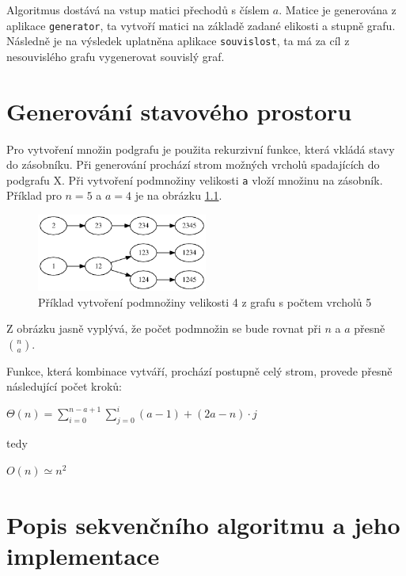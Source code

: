 \documentclass[a4paper,10pt]{report}
\begin{document}
Algoritmus dostává na vstup matici přechodů s číslem $a$. Matice je generována z aplikace \texttt{generator}, ta vytvoří matici na základě zadané elikosti a stupně grafu. Následně je na výsledek uplatněna aplikace \texttt{souvislost}, ta má za cíl z nesouvislého grafu vygenerovat souvislý graf.

\chapter{Generování stavového prostoru}

Pro vytvoření množin podgrafu je použita rekurzivní funkce, která vkládá stavy do zásobníku. Při generování prochází strom možných vrcholů spadajících do podgrafu X. Při vytvoření podmnožiny velikosti \texttt{a} vloží množinu na zásobník. Příklad pro $n=5$ a $a=4$ je na obrázku \ref{fig:com}.

\begin{figure}[H]
  \centering
    \includegraphics[width=0.5\textwidth]{a45.png}
  \caption{Příklad vytvoření podmnožiny velikosti 4 z grafu s počtem vrcholů 5}
  \label{fig:com}
\end{figure}


Z obrázku jasně vyplývá, že počet podmnožin se bude rovnat při $n$ a $a$ přesně ${n\choose a}$.

Funkce, která kombinace vytváří, prochází postupně celý strom, provede přesně následující počet kroků:

\hspace{1cm}

$\Theta(n) = \sum^{n-a+1}_{i=0}\sum^{i}_{j=0} (a-1) + (2a-n)\cdot j$

\hspace{1cm}

tedy

\hspace{1cm}

$O(n) \simeq n^2$

\hspace{1cm}

\chapter{Popis sekvenčního algoritmu a jeho implementace}
\end{document}
